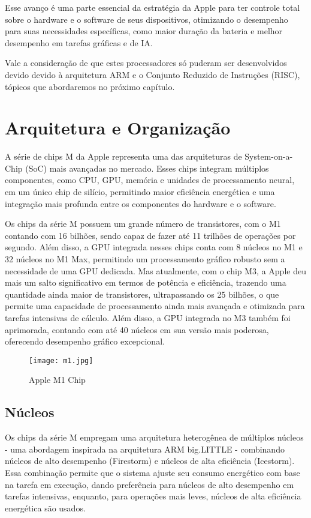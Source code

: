 \documentclass[a4paper,times,12pt]{article}
\begin{document}
Esse avanço é uma parte essencial da estratégia da Apple para ter controle total sobre o hardware e o software de seus dispositivos, otimizando o desempenho para suas necessidades específicas, como maior duração da bateria e melhor desempenho em tarefas gráficas e de IA. 

Vale a consideração de que estes processadores só puderam ser desenvolvidos devido devido à arquitetura ARM e o Conjunto Reduzido de Instruções (RISC), tópicos que abordaremos no próximo capítulo.

\section{Arquitetura e Organização}

\hspace*{+15pt} A série de chips M da Apple representa uma das arquiteturas de System-on-a-Chip (SoC) mais avançadas no mercado. Esses chips integram múltiplos componentes, como CPU, GPU, memória e unidades de processamento neural, em um único chip de silício, permitindo maior eficiência energética e uma integração mais profunda entre os componentes do hardware e o software.

Os chips da série M possuem um grande número de transistores, com o M1 contando com 16 bilhões, sendo capaz de fazer até 11 trilhões de operações por segundo. Além disso, a GPU integrada nesses chips conta com 8 núcleos no M1 e 32 núcleos no M1 Max, permitindo um processamento gráfico robusto sem a necessidade de uma GPU dedicada. Mas atualmente, com o chip M3, a Apple deu mais um salto significativo em termos de potência e eficiência, trazendo uma quantidade ainda maior de transistores, ultrapassando os 25 bilhões, o que permite uma capacidade de processamento ainda mais avançada e otimizada para tarefas intensivas de cálculo. Além disso, a GPU integrada no M3 também foi aprimorada, contando com até 40 núcleos em sua versão mais poderosa, oferecendo desempenho gráfico excepcional.

\begin{figure}[h]
    \centering
    \texttt{[image: m1.jpg]}
    \caption{Apple M1 Chip}
    \label{fig:apple_m1}
\end{figure}

\subsection{Núcleos}
Os chips da série M empregam uma arquitetura heterogênea de múltiplos núcleos - uma abordagem inspirada na arquitetura ARM big.LITTLE - combinando núcleos de alto desempenho (Firestorm) e núcleos de alta eficiência (Icestorm). Essa combinação permite que o sistema ajuste seu consumo energético com base na tarefa em execução, dando preferência para núcleos de alto desempenho em tarefas intensivas, enquanto, para operações mais leves, núcleos de alta eficiência energética são usados.
\end{document}
